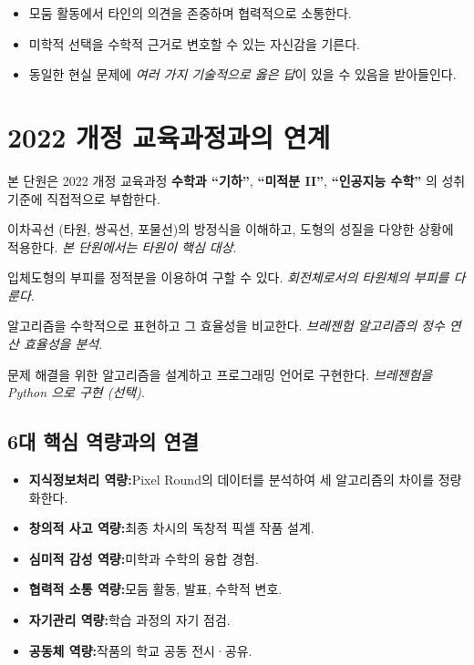 \documentclass[12pt,a4paper]{scrartcl}
\newcommand{\acc}[1]{\textcolor{accent}{\textbf{#1}}}
\begin{document}
\begin{itemize}[leftmargin=1.3em,itemsep=0.15em,topsep=0.3em]
  \item 모둠 활동에서 타인의 의견을 존중하며 협력적으로 소통한다.
  \item 미학적 선택을 수학적 근거로 변호할 수 있는 자신감을 기른다.
  \item 동일한 현실 문제에 \emph{여러 가지 기술적으로 옳은 답}이 있을 수 있음을 받아들인다.
\end{itemize}

\section{2022 개정 교육과정과의 연계}

본 단원은 2022 개정 교육과정 \acc{수학과 ``기하''}, \acc{``미적분 II''}, \acc{``인공지능 수학''} 의 성취기준에 직접적으로 부합한다.

\begin{seongchwi}[기하 --- 이차곡선]
이차곡선 (타원, 쌍곡선, 포물선)의 방정식을 이해하고, 도형의 성질을 다양한 상황에 적용한다. \emph{본 단원에서는 타원이 핵심 대상}.
\end{seongchwi}

\begin{seongchwi}
입체도형의 부피를 정적분을 이용하여 구할 수 있다. \emph{회전체로서의 타원체의 부피를 다룬다}.
\end{seongchwi}

\begin{seongchwi}
알고리즘을 수학적으로 표현하고 그 효율성을 비교한다. \emph{브레젠험 알고리즘의 정수 연산 효율성을 분석}.
\end{seongchwi}

\begin{seongchwi}
문제 해결을 위한 알고리즘을 설계하고 프로그래밍 언어로 구현한다. \emph{브레젠험을 Python 으로 구현 (선택)}.
\end{seongchwi}

\subsection{6대 핵심 역량과의 연결}

\begin{itemize}[leftmargin=1.3em,itemsep=0.15em,topsep=0.3em]
  \item \acc{지식정보처리 역량:}Pixel Round의 데이터를 분석하여 세 알고리즘의 차이를 정량화한다.
  \item \acc{창의적 사고 역량:}최종 차시의 독창적 픽셀 작품 설계.
  \item \acc{심미적 감성 역량:}미학과 수학의 융합 경험.
  \item \acc{협력적 소통 역량:}모둠 활동, 발표, 수학적 변호.
  \item \acc{자기관리 역량:}학습 과정의 자기 점검.
  \item \acc{공동체 역량:}작품의 학교 공동 전시·공유.
\end{itemize}
\end{document}
